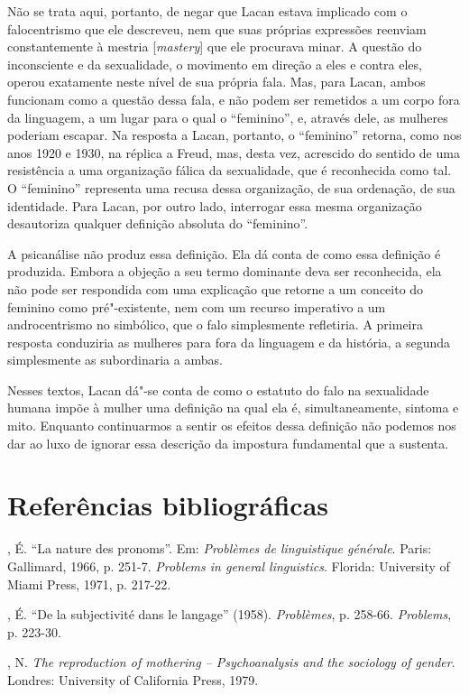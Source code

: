Não se trata aqui, portanto, de negar que Lacan estava implicado com o
falocentrismo que ele descreveu, nem que suas próprias expressões
reenviam constantemente à mestria {[}\emph{mastery}{]} que ele procurava
minar. A questão do inconsciente e da sexualidade, o movimento em
direção a eles e contra eles, operou exatamente neste nível de sua
própria fala. Mas, para Lacan, ambos funcionam como a questão dessa
fala, e não podem ser remetidos a um corpo fora da linguagem, a um lugar
para o qual o ``feminino'', e, através dele, as mulheres poderiam
escapar. Na resposta a Lacan, portanto, o ``feminino'' retorna, como nos
anos 1920 e 1930, na réplica a Freud, mas, desta vez, acrescido do
sentido de uma resistência a uma organização fálica da sexualidade, que
é reconhecida como tal. O ``feminino'' representa uma recusa dessa
organização, de sua ordenação, de sua identidade. Para Lacan, por outro
lado, interrogar essa mesma organização desautoriza qualquer definição
absoluta do ``feminino''.

A psicanálise não produz essa definição. Ela dá conta de como essa
definição é produzida. Embora a objeção a seu termo dominante deva ser
reconhecida, ela não pode ser respondida com uma explicação que retorne
a um conceito do feminino como pré"-existente, nem com um recurso
imperativo a um androcentrismo no simbólico, que o falo simplesmente
refletiria. A primeira resposta conduziria as mulheres para fora da
linguagem e da história, a segunda simplesmente as subordinaria a ambas.

Nesses textos, Lacan dá"-se conta de como o estatuto do falo na
sexualidade humana impõe à mulher uma definição na qual ela é,
simultaneamente, sintoma e mito. Enquanto continuarmos a sentir os
efeitos dessa definição não podemos nos dar ao luxo de ignorar essa
descrição da impostura fundamental que a sustenta.

\section{Referências bibliográficas}

, É. ``La nature des pronoms''. Em: \emph{Problèmes de
linguistique générale}. Paris: Gallimard, 1966, p. 251-7.
\emph{Problems in general linguistics}. Florida: University of Miami
Press, 1971, p. 217-22.

, É. ``De la subjectivité dans le langage'' (1958).
\emph{Problèmes}, p. 258-66. \emph{Problems}, p. 223-30.

, N. \emph{The reproduction of mothering -- Psychoanalysis and
the sociology of gender}. Londres: University of California Press,
1979.

